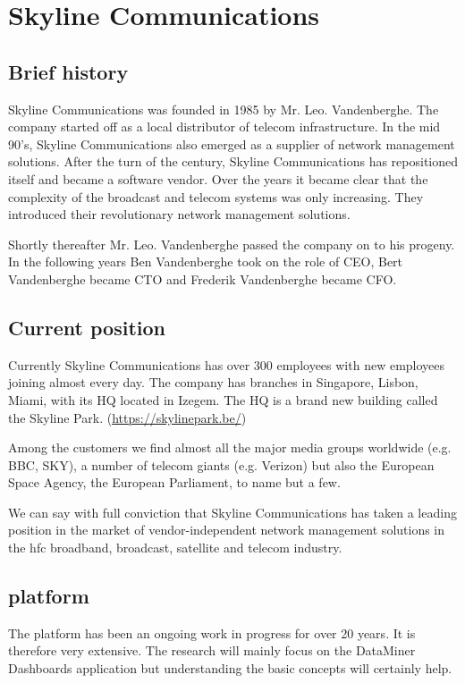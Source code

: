 
\chapter{Skyline Communications}
\section{Brief history}

Skyline Communications was founded in 1985 by Mr. Leo. Vandenberghe. The company started off as a local distributor of telecom infrastructure. In the mid 90's, Skyline Communications also emerged as a supplier of network management solutions. After the turn of the century, Skyline Communications has repositioned itself and became a software vendor. Over the years it became clear that the complexity of the broadcast and telecom systems was only increasing. They introduced their revolutionary \dm network management solutions.

Shortly thereafter Mr. Leo. Vandenberghe passed the company on to his progeny. In the following years Ben Vandenberghe took on the role of CEO, Bert Vandenberghe became CTO and Frederik Vandenberghe became CFO. 

\section{Current position}

Currently Skyline Communications has over 300 employees with new employees joining almost every day. 
The company has branches in Singapore, Lisbon, Miami, with its HQ located in Izegem. 
The HQ is a brand new building called the Skyline Park. (\url{https://skylinepark.be/})

Among the customers we find almost all the major media groups worldwide (e.g. BBC, SKY), a number of telecom giants (e.g. Verizon) but also the European Space Agency, the European Parliament, to name but a few. 

We can say with full conviction that Skyline Communications has taken a leading position in the market of vendor-independent network management solutions in the \gls{hfc} broadband, broadcast, satellite and telecom industry. 

\section{\dm platform}

The \dm platform has been an ongoing work in progress for over 20 years. It is therefore very extensive. The research will mainly focus on the DataMiner Dashboards application but understanding the basic concepts will certainly help.


